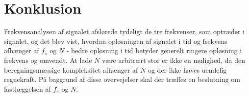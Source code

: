 \section{Konklusion}
Frekvensanalysen af signalet afslørede tydeligt de tre frekvenser, som optræder i signalet, og det blev vist, hvordan opløsningen af signalet i tid og frekvens afhænger af $f_s$ og $N$ - bedre opløsning i tid betyder generelt ringere opløsning i frekvens og omvendt. At lade $N$ være arbitrært stor er ikke en mulighed, da den beregningsmæssige kompleksitet afhænger af $N$ og der ikke haves uendelig regnekraft. På baggrund af disse overvejelser skal der træffes en beslutning om fastlæggelsen af $f_s$ og $N$.
















